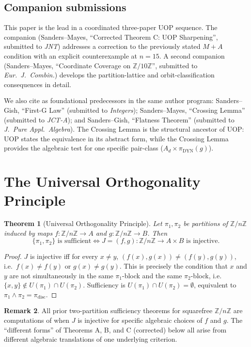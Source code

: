 \documentclass[11pt,reqno]{amsart}
\theoremstyle{plain}
\newtheorem{theorem}{Theorem}
\theoremstyle{definition}
\newtheorem{remark}[theorem]{Remark}
\newcommand{\Z}{\mathbb{Z}}
\newcommand{\Zn}{\Z/n\Z}
\newcommand{\meet}{\wedge}
\newcommand{\disc}{\mathrm{disc}}
\newcommand{\DYN}{\mathrm{DYN}}
\begin{document}
\subsection{Companion submissions}

This paper is the lead in a coordinated three-paper UOP sequence. The companion (Sanders--Mayes, ``Corrected Theorem C: UOP Sharpening'', submitted to \emph{JNT}) addresses a correction to the previously stated $M{+}A$ condition with an explicit counterexample at $n=15$. A second companion (Sanders--Mayes, ``Coordinate Coverage on $\Z/10\Z$'', submitted to \emph{Eur.\ J.\ Combin.}) develops the partition-lattice and orbit-classification consequences in detail.

We also cite as foundational predecessors in the same author program: Sanders--Gish, ``First-G Law'' (submitted to \emph{Integers}); Sanders--Mayes, ``Crossing Lemma'' (submitted to \emph{JCT-A}); and Sanders--Gish, ``Flatness Theorem'' (submitted to \emph{J.\ Pure Appl.\ Algebra}). The Crossing Lemma is the structural ancestor of UOP: UOP states the equivalence in its abstract form, while the Crossing Lemma provides the algebraic test for one specific pair-class ($A_d \times \pi_{\DYN}(g)$).

\section{The Universal Orthogonality Principle} \label{sec:uop}

\begin{theorem}[Universal Orthogonality Principle] \label{thm:uop}
Let $\pi_1,\pi_2$ be partitions of $\Zn$ induced by maps $f \colon \Zn \to A$ and $g \colon \Zn \to B$. Then
\[
\{\pi_1,\pi_2\} \text{ is sufficient} \iff J = (f,g) \colon \Zn \to A \times B \text{ is injective.}
\]
\end{theorem}

\begin{proof}
$J$ is injective iff for every $x \neq y$, $(f(x),g(x)) \neq (f(y),g(y))$, i.e.\ $f(x) \neq f(y)$ or $g(x) \neq g(y)$. This is precisely the condition that $x$ and $y$ are not simultaneously in the same $\pi_1$-block and the same $\pi_2$-block, i.e.\ $\{x,y\} \notin U(\pi_1) \cap U(\pi_2)$. Sufficiency is $U(\pi_1) \cap U(\pi_2) = \emptyset$, equivalent to $\pi_1 \meet \pi_2 = \pi_{\disc}$.
\end{proof}

\begin{remark}
All prior two-partition sufficiency theorems for squarefree $\Zn$ are computations of when $J$ is injective for specific algebraic choices of $f$ and $g$. The ``different forms'' of Theorems A, B, and C (corrected) below all arise from different algebraic translations of one underlying criterion.
\end{remark}
\end{document}
